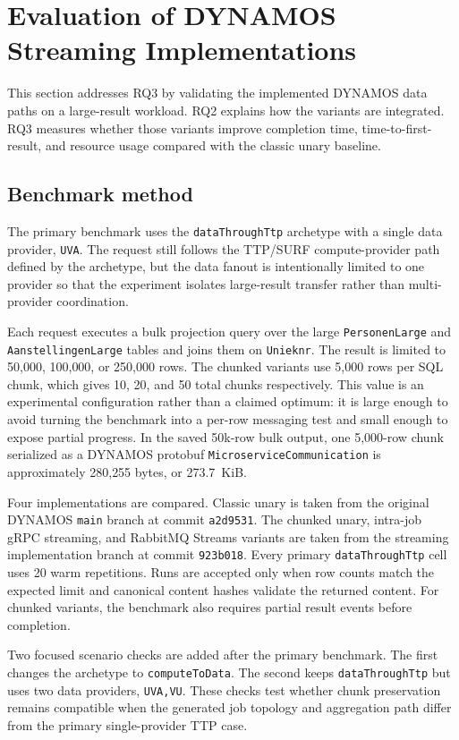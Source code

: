\section{Evaluation of DYNAMOS Streaming Implementations}
\label{sec:dynamos-rq3}

This section addresses RQ3 by validating the implemented DYNAMOS data paths on a large-result workload. RQ2 explains how the variants are integrated. RQ3 measures whether those variants improve completion time, time-to-first-result, and resource usage compared with the classic unary baseline.

\subsection{Benchmark method}

The primary benchmark uses the \texttt{dataThroughTtp} archetype with a single data provider, \texttt{UVA}. The request still follows the TTP/SURF compute-provider path defined by the archetype, but the data fanout is intentionally limited to one provider so that the experiment isolates large-result transfer rather than multi-provider coordination.

Each request executes a bulk projection query over the large \texttt{PersonenLarge} and \texttt{AanstellingenLarge} tables and joins them on \texttt{Unieknr}. The result is limited to 50{,}000, 100{,}000, or 250{,}000 rows. The chunked variants use 5{,}000 rows per SQL chunk, which gives 10, 20, and 50 total chunks respectively. This value is an experimental configuration rather than a claimed optimum: it is large enough to avoid turning the benchmark into a per-row messaging test and small enough to expose partial progress. In the saved 50k-row bulk output, one 5{,}000-row chunk serialized as a DYNAMOS protobuf \texttt{MicroserviceCommunication} is approximately 280{,}255 bytes, or 273.7~KiB.

Four implementations are compared. Classic unary is taken from the original DYNAMOS \texttt{main} branch at commit \texttt{a2d9531}. The chunked unary, intra-job gRPC streaming, and RabbitMQ Streams variants are taken from the streaming implementation branch at commit \texttt{923b018}. Every primary \texttt{dataThroughTtp} cell uses 20 warm repetitions. Runs are accepted only when row counts match the expected limit and canonical content hashes validate the returned content. For chunked variants, the benchmark also requires partial result events before completion.

Two focused scenario checks are added after the primary benchmark. The first changes the archetype to \texttt{computeToData}. The second keeps \texttt{dataThroughTtp} but uses two data providers, \texttt{UVA,VU}. These checks test whether chunk preservation remains compatible when the generated job topology and aggregation path differ from the primary single-provider TTP case.

